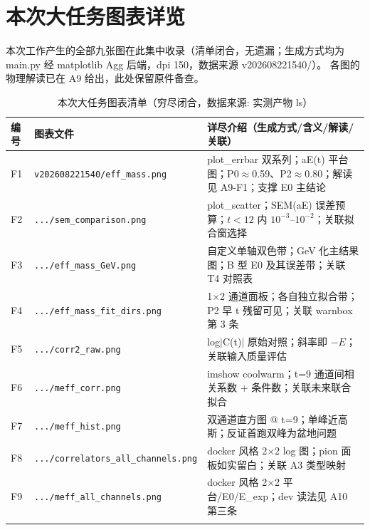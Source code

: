 \documentclass[UTF8]{ctexart}
\begin{document}
\section{本次大任务图表详览}
本次工作产生的全部九张图在此集中收录（清单闭合，无遗漏；生成方式均为
main.py 经 matplotlib Agg 后端，dpi 150，数据来源 v202608221540/）。
各图的物理解读已在 A9 给出，此处保留原件备查。
\begin{xltabular}{\textwidth}{llX}
\toprule
编号 & 图表文件 & 详尽介绍（生成方式/含义/解读/关联） \\
\midrule
\endhead
F1 & \texttt{\nolinkurl{v202608221540/eff_mass.png}} & plot\_errbar 双系列；aE(t) 平台图；P0$\approx$0.59、P2$\approx$0.80；解读见 A9-F1；支撑 E0 主结论 \\
F2 & \texttt{\nolinkurl{.../sem\_comparison.png}} & plot\_scatter；SEM(aE) 误差预算；$t<12$ 内 $10^{-3}$--$10^{-2}$；关联拟合窗选择 \\
F3 & \texttt{\nolinkurl{.../eff\_mass\_GeV.png}} & 自定义单轴双色带；GeV 化主结果图；B 型 E0 及其误差带；关联 T4 对照表 \\
F4 & \texttt{\nolinkurl{.../eff\_mass\_fit\_dirs.png}} & 1$\times$2 通道面板；各自独立拟合带；P2 早 t 残留可见；关联 warnbox 第 3 条 \\
F5 & \texttt{\nolinkurl{.../corr2\_raw.png}} & log$|$C(t)$|$ 原始对照；斜率即 $-E$；关联输入质量评估 \\
F6 & \texttt{\nolinkurl{.../meff\_corr.png}} & imshow coolwarm；t=9 通道间相关系数 + 条件数；关联未来联合拟合 \\
F7 & \texttt{\nolinkurl{.../meff\_hist.png}} & 双通道直方图 @ t=9；单峰近高斯；反证首跑双峰为盆地问题 \\
F8 & \texttt{\nolinkurl{.../correlators\_all\_channels.png}} & docker 风格 2$\times$2 log 图；pion 面板如实留白；关联 A3 类型映射 \\
F9 & \texttt{\nolinkurl{.../meff\_all\_channels.png}} & docker 风格 2$\times$2 平台/E0/E\_exp；dev 读法见 A10 第三条 \\
\bottomrule
\caption{本次大任务图表清单（穷尽闭合，数据来源: 实测产物 ls）}
\end{xltabular}
\end{document}
